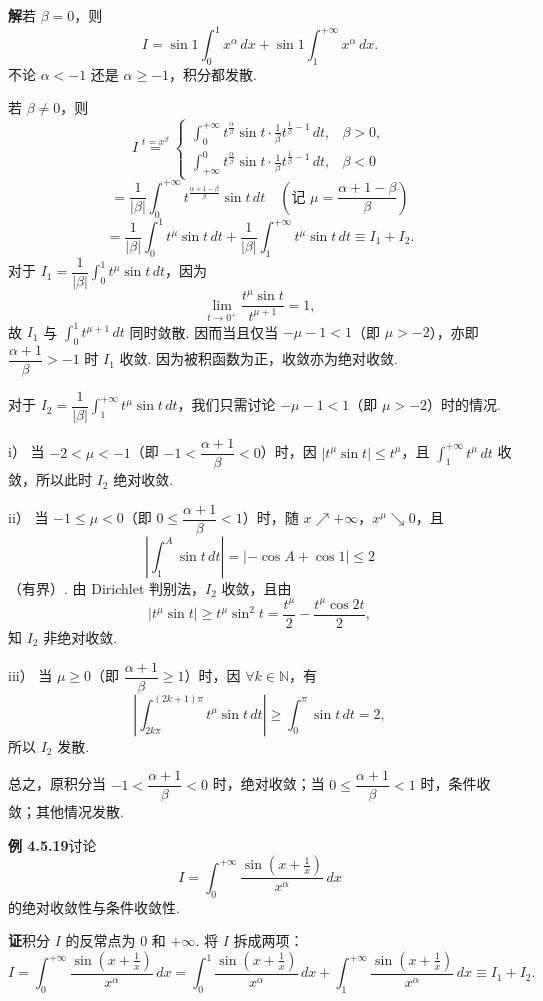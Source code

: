 \documentclass[UTF8, 12pt, fontset=fandol, oneside]{ctexart}
\begin{document}
\noindent\textbf{解}\quad 若 $\beta=0$，则
\[
I=\sin1\int_0^1x^\alpha\,dx+\sin1\int_1^{+\infty}x^\alpha\,dx.
\]
不论 $\alpha<-1$ 还是 $\alpha\ge-1$，积分都发散.

若 $\beta\ne0$，则
\[
I\stackrel{t=x^\beta}{=}
\begin{cases}
\displaystyle\int_0^{+\infty}t^{\frac\alpha\beta}\sin t\cdot\frac1\beta t^{\frac1\beta-1}\,dt,&\beta>0,\\[1.1em]
\displaystyle\int_{+\infty}^0t^{\frac\alpha\beta}\sin t\cdot\frac1\beta t^{\frac1\beta-1}\,dt,&\beta<0
\end{cases}
\]
\[
=\frac1{|\beta|}\int_0^{+\infty}t^{\frac{\alpha+1-\beta}{\beta}}\sin t\,dt
\quad\left(\text{记 }\mu=\frac{\alpha+1-\beta}{\beta}\right)
\]
\[
=\frac1{|\beta|}\int_0^1t^\mu\sin t\,dt
+\frac1{|\beta|}\int_1^{+\infty}t^\mu\sin t\,dt
\equiv I_1+I_2.
\]
对于 $I_1=\dfrac1{|\beta|}\int_0^1t^\mu\sin t\,dt$，因为
\[
\lim_{t\to0^+}\frac{t^\mu\sin t}{t^{\mu+1}}=1,
\]
故 $I_1$ 与 $\displaystyle\int_0^1t^{\mu+1}\,dt$ 同时敛散. 因而当且仅当 $-\mu-1<1$（即 $\mu>-2$），亦即 $\dfrac{\alpha+1}{\beta}>-1$ 时 $I_1$ 收敛. 因为被积函数为正，收敛亦为绝对收敛.

对于 $I_2=\dfrac1{|\beta|}\int_1^{+\infty}t^\mu\sin t\,dt$，我们只需讨论 $-\mu-1<1$（即 $\mu>-2$）时的情况.

i） 当 $-2<\mu<-1$（即 $-1<\dfrac{\alpha+1}{\beta}<0$）时，因 $|t^\mu\sin t|\le t^\mu$，且 $\displaystyle\int_1^{+\infty}t^\mu\,dt$ 收敛，所以此时 $I_2$ 绝对收敛.

ii） 当 $-1\le\mu<0$（即 $0\le\dfrac{\alpha+1}{\beta}<1$）时，随 $x\nearrow+\infty$，$x^\mu\searrow0$，且
\[
\left|\int_1^A\sin t\,dt\right|
=|-\cos A+\cos1|\le2
\]
（有界）. 由 Dirichlet 判别法，$I_2$ 收敛，且由
\[
|t^\mu\sin t|\ge t^\mu\sin^2t=\frac{t^\mu}{2}-\frac{t^\mu\cos2t}{2},
\]
知 $I_2$ 非绝对收敛.

iii） 当 $\mu\ge0$（即 $\dfrac{\alpha+1}{\beta}\ge1$）时，因 $\forall k\in\mathbb{N}$，有
\[
\left|\int_{2k\pi}^{(2k+1)\pi}t^\mu\sin t\,dt\right|
\ge\int_0^\pi\sin t\,dt=2,
\]
所以 $I_2$ 发散.

总之，原积分当 $-1<\dfrac{\alpha+1}{\beta}<0$ 时，绝对收敛；当 $0\le\dfrac{\alpha+1}{\beta}<1$ 时，条件收敛；其他情况发散.

\noindent\textbf{例 4.5.19}\quad 讨论
\[
I=\int_0^{+\infty}\frac{\sin\left(x+\frac1x\right)}{x^\alpha}\,dx
\]
的绝对收敛性与条件收敛性.

\noindent\textbf{证}\quad 积分 $I$ 的反常点为 $0$ 和 $+\infty$. 将 $I$ 拆成两项：
\[
I=\int_0^{+\infty}\frac{\sin\left(x+\frac1x\right)}{x^\alpha}\,dx
=\int_0^1\frac{\sin\left(x+\frac1x\right)}{x^\alpha}\,dx
+\int_1^{+\infty}\frac{\sin\left(x+\frac1x\right)}{x^\alpha}\,dx
\equiv I_1+I_2.
\]
\end{document}
